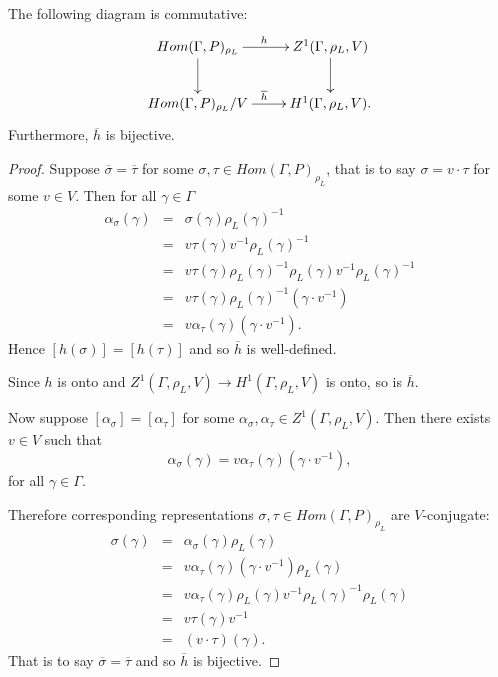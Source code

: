 \begin{lemma}
  The following diagram is commutative:
  \begin{displaymath}
    \xymatrix{
    Hom(\Gamma, P)_{\rho_L} \ar[r]^h \ar[d] & Z^{1}(\Gamma, \rho_L, V) \ar[d] \\
    Hom(\Gamma, P)_{\rho_L}/V \ar[r]^{\overline{h}} & H^{1}(\Gamma, \rho_L, V).
    }
  \end{displaymath}
  Furthermore, $\overline{h}$ is bijective.
  \label{lem:v_h1}
\end{lemma}
\begin{proof}  
  Suppose $\overline{\sigma} = \overline{\tau}$ for some $\sigma,\tau\in Hom(\Gamma, P)_{\rho_L}$, that is to say $\sigma = v\cdot\tau$ for some $v\in V$. Then for all $\gamma\in \Gamma$
  \begin{eqnarray*}
    \alpha_\sigma(\gamma) &=& \sigma(\gamma)\rho_L(\gamma)^{-1}\\
    &=& v\tau(\gamma)v^{-1}\rho_L(\gamma)^{-1}\\
    &=& v\tau(\gamma)\rho_L(\gamma)^{-1}\rho_L(\gamma)v^{-1}\rho_L(\gamma)^{-1}\\
    &=& v\tau(\gamma)\rho_L(\gamma)^{-1}(\gamma\cdot v^{-1})\\
    &=& v\alpha_\tau(\gamma)(\gamma\cdot v^{-1}).
  \end{eqnarray*}
  Hence $[h(\sigma)] = [h(\tau)]$ and so $\overline{h}$ is well-defined. 
  
  Since $h$ is onto and $Z^1(\Gamma, \rho_L, V) \rightarrow H^1(\Gamma, \rho_L, V)$ is onto, so is $\overline{h}$.
  
  Now suppose $[\alpha_\sigma] = [\alpha_\tau]$ for some $\alpha_\sigma, \alpha_\tau \in Z^1(\Gamma, \rho_L, V)$. Then there exists $v \in V$ such that
  \begin{displaymath}
    \alpha_\sigma(\gamma) = v \alpha_\tau(\gamma)(\gamma \cdot v^{-1}),
  \end{displaymath}
  for all $\gamma \in \Gamma$.

  Therefore corresponding representations $\sigma, \tau \in Hom(\Gamma, P)_{\rho_L}$ are $V$-conjugate:
  \begin{eqnarray*}
    \sigma(\gamma) &=&  \alpha_\sigma(\gamma)\rho_L(\gamma) \\
    &=& v \alpha_\tau(\gamma)(\gamma \cdot v^{-1}) \rho_L(\gamma) \\
    &=& v \alpha_\tau(\gamma)\rho_L(\gamma) v^{-1} \rho_L(\gamma)^{-1} \rho_L(\gamma) \\
    &=& v \tau(\gamma) v^{-1} \\
    &=& (v \cdot \tau)(\gamma).
  \end{eqnarray*}
  That is to say $\overline{\sigma} = \overline{\tau}$ and so $\overline{h}$ is bijective.
\end{proof}

